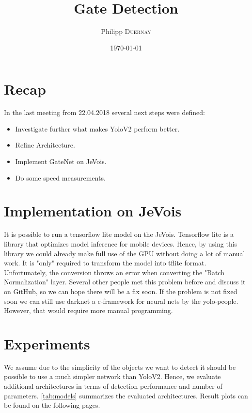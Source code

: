 \documentclass{article}
\title{Gate Detection} %
\author{Philipp \textsc{Duernay}} %
\date{\today} %
\begin{document}
\maketitle


\section{Recap}
In the last meeting from 22.04.2018 several next steps were defined:
\begin{itemize}
	\item Investigate further what makes YoloV2 perform better.
	\item Refine Architecture.
	\item Implement GateNet on JeVois.
	\item Do some speed measurements.
\end{itemize}


\section{Implementation on JeVois}

It is possible to run a tensorflow lite model on the JeVois. Tensorflow lite is a library that optimizes model inference for mobile devices. Hence, by using this library we could already make full use of the GPU without doing a lot of manual work. It is "only" required to transform the model into tflite format. Unfortunately, the conversion throws an error when converting the "Batch Normalization" layer. Several other people met this problem before and discuss it on GitHub, so we can hope there will be a fix soon. If the problem is not fixed soon we can still use darknet a c-framework for neural nets by the yolo-people. However, that would require more manual programming.

\section{Experiments}

We assume due to the simplicity of the objects we want to detect it should be possible to use a much simpler network than YoloV2. Hence, we evaluate additional architectures in terms of detection performance and number of parameters. \autoref{tab:models} summarizes the evaluated architectures. Result plots can be found on the following pages.
\end{document}
